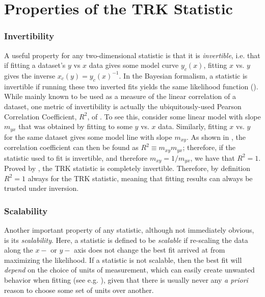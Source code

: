 \chapter{Properties of the TRK Statistic}
\label{cha:properties}

\subsection{Invertibility}
\label{sec:invertibility}
A useful property for any two-dimensional statistic is that it is \textit{invertible}, i.e. that if fitting a dataset's $y$ vs $x$ data gives some model curve $y_c(x)$, fitting $x$ vs. $y$ gives the inverse $x_c(y)=y_c(x)^{-1}$. In the Bayesian formalism, a statistic is invertible if running these two inverted fits yields the same likelihood function (\textcite{trotter}). While mainly known to be used as a measure of the linear correlation of a dataset, one metric of invertibility is actually the ubiquitously-used Pearson Correlation Coefficient, $R^2$, of \textcite{pearson1896vii}. To see this, consider some linear model with slope $m_{yx}$ that was obtained by fitting to some $y$ vs. $x$ data. Similarly, fitting $x$ vs. $y$ for the same dataset gives some model line with slope $m_{xy}$. As shown in \textcite{trotter}, the correlation coefficient can then be found as $R^2\equiv m_{xy}m_{yx}$; therefore, if the statistic used to fit is invertible, and therefore $m_{xy}=1/m_{yx}$, we have that $R^2=1$. Proved by \textcite{trotter}, the TRK statistic is completely invertible. Therefore, by definition $R^2=1$ always for the TRK statistic, meaning that fitting results can always be trusted under inversion.

\subsection{Scalability}
\label{sec:scalability}
Another important property of any statistic, although not immediately obvious, is its \textit{scalability}. Here, a statistic is defined to be \textit{scalable} if re-scaling the data along the $x-$ or $y-$ axis does not change the best fit arrived at from maximizing the likelihood. If a statistic is not scalable, then the best fit will \textit{depend} on the choice of units of measurement, which can easily create unwanted behavior when fitting (see e.g. \textcite{trotter}), given that there is usually never any \textit{a priori} reason to choose some set of units over another.

